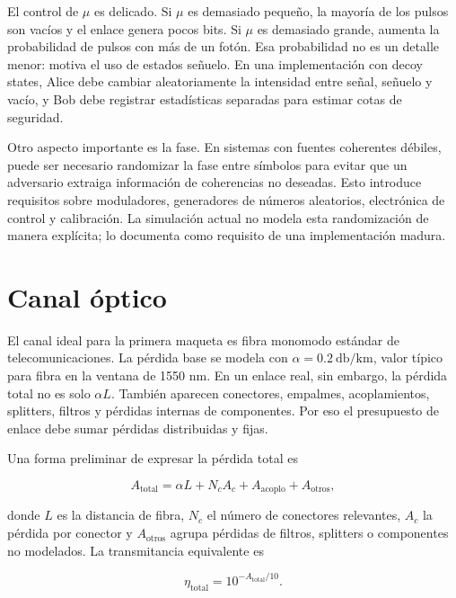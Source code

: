 El control de \(\mu\) es delicado. Si \(\mu\) es demasiado pequeño, la mayoría de los pulsos son vacíos y el enlace genera pocos bits. Si \(\mu\) es demasiado grande, aumenta la probabilidad de pulsos con más de un fotón. Esa probabilidad no es un detalle menor: motiva el uso de estados señuelo. En una implementación con decoy states, Alice debe cambiar aleatoriamente la intensidad entre señal, señuelo y vacío, y Bob debe registrar estadísticas separadas para estimar cotas de seguridad.

Otro aspecto importante es la fase. En sistemas con fuentes coherentes débiles, puede ser necesario randomizar la fase entre símbolos para evitar que un adversario extraiga información de coherencias no deseadas. Esto introduce requisitos sobre moduladores, generadores de números aleatorios, electrónica de control y calibración. La simulación actual no modela esta randomización de manera explícita; lo documenta como requisito de una implementación madura.

\section{Canal óptico}

El canal ideal para la primera maqueta es fibra monomodo estándar de telecomunicaciones. La pérdida base se modela con \(\alpha=\SI{0.2}{\decibel\per\kilo\meter}\), valor típico para fibra en la ventana de 1550 nm. En un enlace real, sin embargo, la pérdida total no es solo \(\alpha L\). También aparecen conectores, empalmes, acoplamientos, splitters, filtros y pérdidas internas de componentes. Por eso el presupuesto de enlace debe sumar pérdidas distribuidas y fijas.

Una forma preliminar de expresar la pérdida total es

\begin{equation}
  A_\text{total} = \alpha L + N_c A_c + A_\text{acoplo} + A_\text{otros},
  \label{eq:perdida_total}
\end{equation}

donde \(L\) es la distancia de fibra, \(N_c\) el número de conectores relevantes, \(A_c\) la pérdida por conector y \(A_\text{otros}\) agrupa pérdidas de filtros, splitters o componentes no modelados. La transmitancia equivalente es

\begin{equation}
  \eta_\text{total} = 10^{-A_\text{total}/10}.
  \label{eq:transmitancia_total}
\end{equation}

